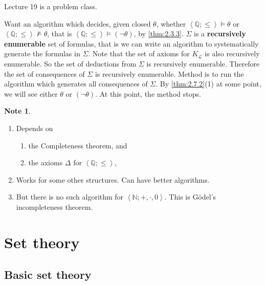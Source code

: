 \documentclass{article}
\newcommand{\N}{\mathbb{N}}
\newcommand{\Q}{\mathbb{Q}}
\renewcommand{\L}{\mathcal{L}}
\newcommand{\rb}[1]{\left( #1 \right)}
\newcommand{\ab}[1]{\left\langle #1 \right\rangle}
\newcommand{\notb}[1]{\rb{\neg #1}}
\theoremstyle{definition}\newtheorem{definition}{Definition}[subsection]
\theoremstyle{definition}\newtheorem{remark}[definition]{Remark}
\theoremstyle{definition}\newtheorem*{example}{Example}
\theoremstyle{definition}\newtheorem*{note}{Note}
\begin{document}

Lecture 19 is a problem class.


Want an algorithm which decides, given closed $ \theta $, whether $ \ab{\Q; \le} \vDash \theta $ or $ \ab{\Q; \le} \not\vDash \theta $, that is $ \ab{\Q; \le} \vDash \notb{\theta} $, by \ref{thm:2.3.3}. $ \Sigma $ is a \textbf{recursively enumerable} set of formulas, that is we can write an algorithm to systematically generate the formulas in $ \Sigma $. Note that the set of axioms for $ K_{\L} $ is also recursively enumerable. So the set of deductions from $ \Sigma $ is recursively enumerable. Therefore the set of consequences of $ \Sigma $ is recursively enumerable. Method is to run the algorithm which generates all consequences of $ \Sigma $. By \ref{thm:2.7.2}(1) at some point, we will see either $ \theta $ or $ \notb{\theta} $. At this point, the method stops.

\begin{note}
\hfill
\begin{enumerate}
\item Depends on
\begin{enumerate}
\item the Completeness theorem, and
\item the axioms $ \Delta $ for $ \ab{\Q; \le} $,
\end{enumerate}
\item Works for some other structures. Can have better algorithms.
\item But there is no such algorithm for $ \ab{\N; +, \cdot, 0} $. This is Gödel's incompleteness theorem.
\end{enumerate}
\end{note}

\section{Set theory}

\setcounter{subsection}{-1}

\subsection{Basic set theory}
\end{document}
